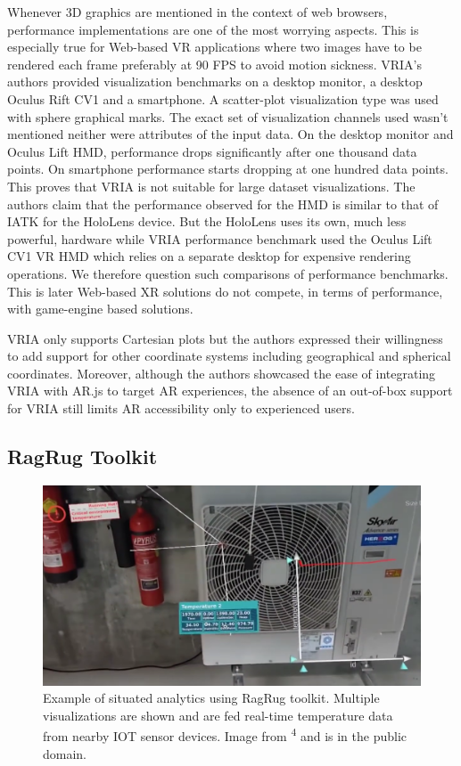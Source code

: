\documentclass{vgtc}                          %
\begin{document}
\noindent Whenever 3D graphics are mentioned in the context of web browsers,
performance implementations are one of the most worrying aspects. This is
especially true for Web-based VR applications where two images have to be
rendered each frame preferably at 90 FPS to avoid motion sickness. VRIA's
authors provided visualization benchmarks on a desktop monitor, a desktop
Oculus Rift CV1 and a smartphone. A scatter-plot visualization type was used
with sphere graphical marks. The exact set of visualization channels used
wasn't mentioned neither were attributes of the input data. On the desktop
monitor and Oculus Lift HMD, performance drops significantly after one
thousand data points. On smartphone performance starts dropping at one hundred
data points. This proves that VRIA is not suitable for large dataset
visualizations. The authors claim that the performance observed for the HMD
is similar to that of IATK for the HoloLens device. But the HoloLens uses
its own, much less powerful, hardware while VRIA performance benchmark used
the Oculus Lift CV1 VR HMD which relies on a separate desktop for expensive
rendering operations. We therefore question such comparisons of performance
benchmarks. This is later Web-based XR solutions do not compete,
in terms of performance, with game-engine based solutions.

\smallskip

\noindent VRIA only supports Cartesian plots but the authors expressed their
willingness to add support for other coordinate systems including geographical
and spherical coordinates.
Moreover, although the authors showcased the ease of integrating VRIA with
AR.js to target AR experiences, the absence of an out-of-box support for VRIA
still limits AR accessibility only to experienced users.

\subsection{RagRug Toolkit}

\begin{figure}[tb]
	\centering
	\includegraphics[width=\columnwidth]{ragrug_example}
	\caption[Caption for RagRug]{Example of situated analytics using RagRug
		toolkit. Multiple visualizations are shown and are fed real-time
		temperature data from nearby IOT sensor devices.
		Image from \textsuperscript{4} and is in the public domain. }
	\label{fig:ragrug_example}
\end{figure}
\end{document}
